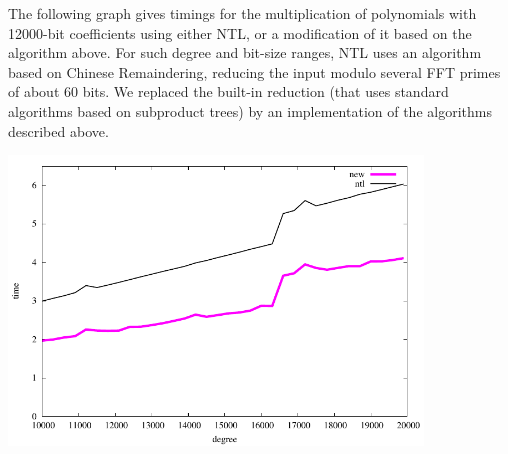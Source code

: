\documentclass[acmtoms]{acmsmall}
\begin{document}
The following graph gives timings for the multiplication of
polynomials with 12000-bit coefficients using either NTL, or a
modification of it based on the algorithm above. For such degree and
bit-size ranges, NTL uses an algorithm based on Chinese Remaindering,
reducing the input modulo several FFT primes of about 60 bits. We
replaced the built-in reduction (that uses standard algorithms based
on subproduct trees) by an implementation of the algorithms described above.

\begin{center}
  \includegraphics[width=11cm]{BENCH/bench12000.pdf}
\end{center}



\end{document}
